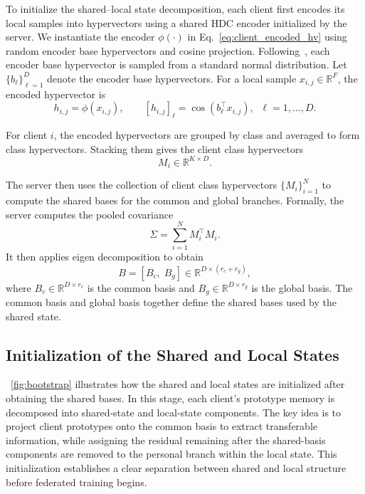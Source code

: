 \documentclass[lettersize,journal]{IEEEtran}
\newcommand{\rev}[1]{#1}
\begin{document}
To initialize the \rev{shared--local state decomposition}, each client first encodes its local samples into hypervectors using a shared HDC encoder initialized by the server.
\rev{We instantiate the encoder $\phi(\cdot)$ in Eq.~\eqref{eq:client_encoded_hv} using random encoder base hypervectors and cosine projection.} Following~\cite{imani2020dual}, each encoder base hypervector is sampled from a standard normal distribution.
Let $\{b_\ell\}_{\ell=1}^D$ denote the encoder base hypervectors.
For a local sample $x_{i,j}\in\mathbb{R}^{F}$, the encoded hypervector is
\begin{equation}
\label{eq:local_hv}
h_{i,j}=\phi(x_{i,j}),
\qquad
[h_{i,j}]_\ell = \cos(b_\ell^\top x_{i,j}),
\;\; \ell=1,\dots,D.
\end{equation}

For client $i$, the encoded hypervectors are grouped by class and averaged to form class hypervectors.
Stacking them gives the client class hypervectors
\begin{equation}
M_i \in \mathbb{R}^{K\times D}.
\end{equation}

The server then uses the collection of client class hypervectors $\{M_i\}_{i=1}^N$ to compute the \rev{shared bases for the common and global branches}.
Formally, the server computes the pooled covariance
\begin{equation}
\label{eq:cov}
\Sigma
=
\sum_{i=1}^{N} M_i^\top M_i.
\end{equation}
It then applies eigen decomposition to obtain
\begin{equation}
B = [B_c,\; B_g] \in \mathbb{R}^{D\times(r_c+r_g)},
\end{equation}
where $B_c \in \mathbb{R}^{D\times r_c}$ is the common basis and $B_g \in \mathbb{R}^{D\times r_g}$ is the global basis.
The common basis and global basis together define the \rev{shared bases used by the shared state}.





\subsection{Initialization of the \rev{Shared and Local States}}
\label{subsec:bootstrap_init}

\rev{\Figure~\ref{fig:bootstrap} illustrates how the shared and local states are initialized after obtaining the shared bases.}
\rev{In this stage, each client's prototype memory is decomposed into shared-state and local-state components.}
The key idea is to project client prototypes onto the \rev{common basis} to extract transferable information, while assigning the residual \rev{remaining after the shared-basis components are removed to the personal branch within the local state}.
This initialization establishes a clear separation between shared and \rev{local} structure before federated training begins.
\end{document}
